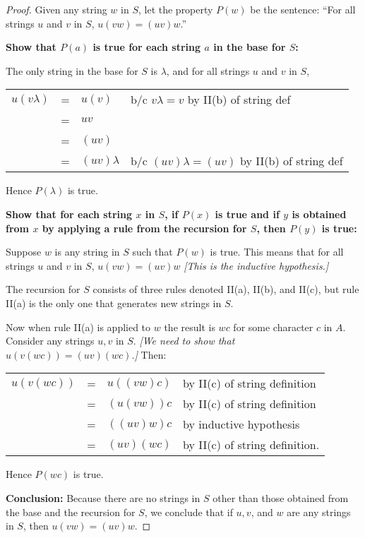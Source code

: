 \documentclass[14pt]{extarticle}
\newcommand{\cy}{\color{cyan}}
\begin{document}
\begin{proof}
    Given any string $w$ in $S$, let the property $P(w)$ be the sentence:
    ``For all strings $u$ and $v$ in $S$, \(u(vw) = (uv)w\).''

    {\bf Show that $P(a)$ is true for each string $a$ in the base for $S$:}

    The only string in the base for $S$ is $\lambda$, and for all strings $u$ and $v$ in $S$,
    \begin{center}
        \begin{tabular}{rcll}
            \(u(v \lambda)\) & = & \(u(v)\)         & {\cy b/c $v \lambda = v$ by II(b) of string def}       \\
                             & = & \(uv\)           &                                                        \\
                             & = & \((uv)\)         &                                                        \\
                             & = & \((uv) \lambda\) & {\cy b/c $(uv) \lambda = (uv)$ by II(b) of string def}
        \end{tabular}
    \end{center}
    Hence $P(\lambda)$ is true.

        {\bf Show that for each string $x$ in $S$, if $P(x)$ is true and if $y$ is obtained from $x$ by applying a rule
            from the recursion for $S$, then $P(y)$ is true:}

    Suppose $w$ is any string in $S$ such that $P(w)$ is true. This means that for all strings $u$ and $v$ in $S$,
    \(u(vw) = (uv)w\) {\it [This is the inductive hypothesis.]}

    The recursion for $S$ consists of three rules denoted II(a), II(b), and II(c), but rule II(a) is the only one
    that generates new strings in $S$.

    Now when rule II(a) is applied to $w$ the result is $wc$ for some character $c$ in $A$. Consider any strings $u, v$ in $S$. {\it [We need to show that \(u(v(wc)) = (uv)(wc)\).]} Then:
    \begin{center}
        \begin{tabular}{rcll}
            \(u(v(wc))\) & = & \(u((vw)c)\) & {\cy by II(c) of string definition}  \\
                         & = & \((u(vw))c\) & {\cy by II(c) of string definition}  \\
                         & = & \(((uv)w)c\) & {\cy by inductive hypothesis}        \\
                         & = & \((uv)(wc)\) & {\cy by II(c) of string definition.}
        \end{tabular}
    \end{center}
    Hence $P(wc)$ is true.

        {\bf Conclusion:} Because there are no strings in $S$ other than those obtained from the base and the recursion for
    $S$, we conclude that if $u, v$, and $w$ are any strings in $S$, then \(u(vw) = (uv)w\).
\end{proof}
\end{document}
